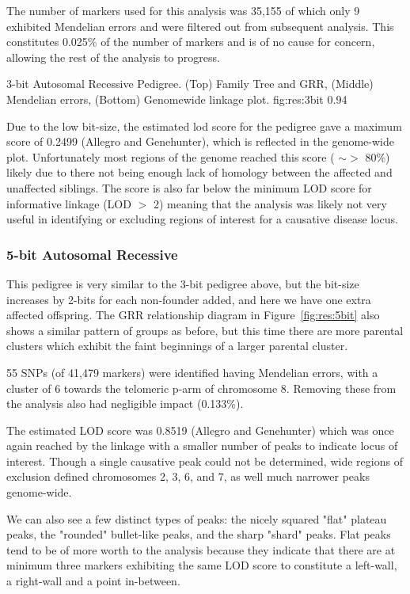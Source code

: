 The number of markers used for this analysis was 35,155 of which only 9 exhibited Mendelian errors and were filtered out from subsequent analysis. This constitutes 0.025\% of the number of markers and is of no cause for concern, allowing the rest of the analysis to progress.

{3-bit Autosomal Recessive Pedigree. (Top) Family Tree and GRR, (Middle) Mendelian errors, (Bottom) Genomewide linkage plot.}
{fig:res:3bit}
{0.94}

Due to the low bit-size, the estimated lod score for the pedigree gave a maximum score of 0.2499 (Allegro and Genehunter), which is reflected in the genome-wide plot. Unfortunately most regions of the genome reached this score ( $\sim>$ 80\%) likely due to there not being enough lack of homology between the affected and unaffected siblings. The score is also far below the minimum LOD score for informative linkage (LOD $>$ 2) meaning that the analysis was likely not very useful in identifying or excluding regions of interest for a causative disease locus.

\subsubsection*{5-bit Autosomal Recessive}

This pedigree is very similar to the 3-bit pedigree above, but the bit-size increases by 2-bits for each non-founder added, and here we have one extra affected offspring. The GRR relationship diagram in Figure~\ref{fig:res:5bit} also shows a similar pattern of groups as before, but this time there are more parental clusters which exhibit the faint beginnings of a larger parental cluster. 

55 SNPs (of 41,479 markers) were identified having Mendelian errors, with a cluster of 6 towards the telomeric p-arm of chromosome 8. Removing these from the analysis also had negligible impact (0.133\%).

The estimated LOD score was 0.8519 (Allegro and Genehunter) which was once again reached by the linkage with a smaller number of peaks to indicate locus of interest. Though a single causative peak could not be determined, wide regions of exclusion defined chromosomes 2, 3, 6, and 7, as well much narrower peaks genome-wide.

We can also see a few distinct types of peaks: the nicely squared "flat" plateau peaks, the "rounded" bullet-like peaks, and the sharp "shard" peaks. Flat peaks tend to be of more worth to the analysis because they indicate that there are at minimum three markers exhibiting the same LOD score to constitute a left-wall, a right-wall and a point in-between. 

